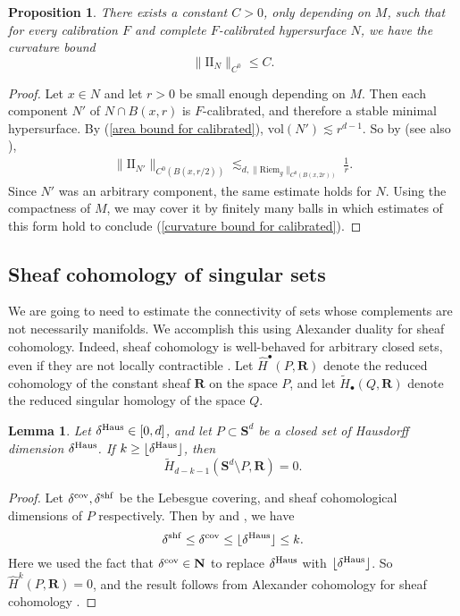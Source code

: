 \documentclass[reqno,11pt]{amsart}
\newcommand{\NN}{\mathbf{N}}
\newcommand{\RR}{\mathbf{R}}
\newcommand{\Sph}{\mathbf S}
\newcommand{\Two}{\mathrm{I\!I}}
\newcommand{\vol}{\mathrm{vol}}
\newcommand{\Riem}{\mathrm{Riem}}
\newtheorem{lemma}[theorem]{Lemma}
\newtheorem{proposition}[theorem]{Proposition}
\theoremstyle{definition}
\numberwithin{equation}{section}
\begin{document}
\begin{proposition}
There exists a constant $C > 0$, only depending on $M$, such that for every calibration $F$ and complete $F$-calibrated hypersurface $N$, we have the curvature bound
\begin{equation}\label{curvature bound for calibrated}
\|\Two_N\|_{C^0} \leq C.
\end{equation}
\end{proposition}
\begin{proof}
Let $x \in N$ and let $r > 0$ be small enough depending on $M$.
Then each component $N'$ of $N \cap B(x, r)$ is $F$-calibrated, and therefore a stable minimal hypersurface.
By (\ref{area bound for calibrated}), $\vol(N') \lesssim r^{d - 1}$.
So by \cite[pg785, Corollary 1]{Schoen81} (see also \cite[Chapter 2, \S\S4-5]{colding2011course}),
\begin{align*}
\|\Two_{N'}\|_{C^0(B(x, r/2))} \lesssim_{d, \|\Riem_g\|_{C^0(B(x, 2r))}} \frac{1}{r}.
\end{align*}
Since $N'$ was an arbitrary component, the same estimate holds for $N$.
Using the compactness of $M$, we may cover it by finitely many balls in which estimates of this form hold to conclude (\ref{curvature bound for calibrated}).
\end{proof}

\subsection{Sheaf cohomology of singular sets}
We are going to need to estimate the connectivity of sets whose complements are not necessarily manifolds.
We accomplish this using Alexander duality for sheaf cohomology.
Indeed, sheaf cohomology is well-behaved for arbitrary closed sets, even if they are not locally contractible \cite{Kaplan47}.
Let $\hat H^\bullet(P, \RR)$ denote the reduced cohomology of the constant sheaf $\RR$ on the space $P$, and let $\tilde H_\bullet(Q, \RR)$ denote the reduced singular homology of the space $Q$.

\begin{lemma}\label{closed mfld complement}
Let $\delta^{\rm Haus} \in [0, d]$, and let $P \subset \Sph^d$ be a closed set of Hausdorff dimension $\delta^{\rm Haus}$.
If $k \geq \lfloor \delta^{\rm Haus} \rfloor$, then
$$\tilde H_{d - k - 1}(\Sph^d \setminus P, \RR) = 0.$$
\end{lemma}
\begin{proof}
Let $\delta^{\rm cov}, \delta^{\rm shf}$ be the Lebesgue covering, and sheaf cohomological dimensions of $P$ respectively.
Then by \cite[{\S}II.5.12]{godement1973topologie} and \cite[Theorem 6.3.10]{edgar2008measure}, we have 
$$\delta^{\rm shf} \leq \delta^{\rm cov} \leq \lfloor \delta^{\rm Haus} \rfloor \leq k.$$
Here we used the fact that $\delta^{\rm cov} \in \NN$ to replace $\delta^{\rm Haus}$ with $\lfloor \delta^{\rm Haus} \rfloor$.
So $\hat H^k(P, \RR) = 0$, and the result follows from Alexander cohomology for sheaf cohomology \cite[Theorem 6]{Kaplan47}.
\end{proof}
\end{document}
